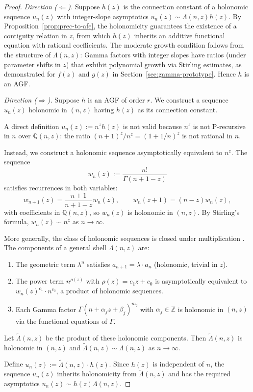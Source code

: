 \documentclass[11pt,reqno]{amsart}
\theoremstyle{definition}
\newcommand{\Z}{\mathbb{Z}}
\newcommand{\Q}{\mathbb{Q}}
\numberwithin{equation}{section}
\begin{document}
\begin{proof}
\textit{Direction ($\Leftarrow$).} Suppose $h(z)$ is the connection constant of a holonomic sequence $u_n(z)$ with integer-slope asymptotics $u_n(z) \sim \Lambda(n,z)h(z)$. By Proposition~\ref{prop:prec-to-afe}, the holonomicity guarantees the existence of a contiguity relation in $z$, from which $h(z)$ inherits an additive functional equation with rational coefficients. The moderate growth condition follows from the structure of $\Lambda(n,z)$: Gamma factors with integer slopes have ratios (under parameter shifts in $z$) that exhibit polynomial growth via Stirling estimates, as demonstrated for $f(z)$ and $g(z)$ in Section~\ref{sec:gamma-prototype}. Hence $h$ is an AGF.

\textit{Direction ($\Rightarrow$).} Suppose $h$ is an AGF of order $r$. We construct a sequence $u_n(z)$ holonomic in $(n,z)$ having $h(z)$ as its connection constant.

A direct definition $u_n(z) := n^z h(z)$ is not valid because $n^z$ is not P-recursive in $n$ over $\Q(n,z)$: the ratio $(n+1)^z/n^z = (1+1/n)^z$ is not rational in $n$.

Instead, we construct a holonomic sequence asymptotically equivalent to $n^z$. The sequence
$$w_n(z) := \frac{n!}{\Gamma(n+1-z)}$$
satisfies recurrences in both variables:
$$w_{n+1}(z) = \frac{n+1}{n+1-z} w_n(z), \qquad w_n(z+1) = (n-z) w_n(z),$$
with coefficients in $\Q(n,z)$, so $w_n(z)$ is holonomic in $(n,z)$. By Stirling's formula, $w_n(z) \sim n^z$ as $n \to \infty$.

More generally, the class of holonomic sequences is closed under multiplication \cite{Stanley1999}. The components of a general shell $\Lambda(n,z)$ are:
\begin{enumerate}
\item The geometric term $\lambda^n$ satisfies $a_{n+1} = \lambda \cdot a_n$ (holonomic, trivial in $z$).
\item The power term $n^{\rho(z)}$ with $\rho(z) = c_1 z + c_0$ is asymptotically equivalent to $w_n(z)^{c_1} \cdot n^{c_0}$, a product of holonomic sequences.
\item Each Gamma factor $\Gamma(n + \alpha_j z + \beta_j)^{m_j}$ with $\alpha_j \in \Z$ is holonomic in $(n,z)$ via the functional equations of $\Gamma$.
\end{enumerate}

Let $\widetilde{\Lambda}(n,z)$ be the product of these holonomic components. Then $\widetilde{\Lambda}(n,z)$ is holonomic in $(n,z)$ and $\widetilde{\Lambda}(n,z) \sim \Lambda(n,z)$ as $n \to \infty$.

Define $u_n(z) := \widetilde{\Lambda}(n,z) \cdot h(z)$. Since $h(z)$ is independent of $n$, the sequence $u_n(z)$ inherits holonomicity from $\widetilde{\Lambda}(n,z)$ and has the required asymptotics $u_n(z) \sim h(z) \Lambda(n,z)$.
\end{proof}
\end{document}
